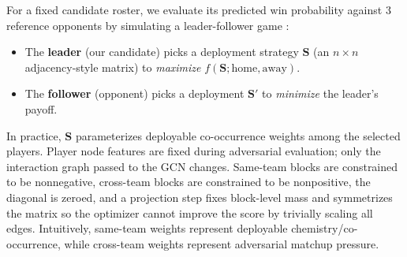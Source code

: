 \documentclass[11pt,letterpaper]{article}
\begin{document}
For a fixed candidate roster, we evaluate its predicted win probability
against $3$ reference opponents by simulating a leader-follower game
\cite{conitzer2006commit}:

\begin{itemize}[leftmargin=*]
  \item The \textbf{leader} (our candidate) picks a deployment strategy
    $\mathbf{S}$ (an $n \times n$ adjacency-style matrix) to
    \emph{maximize} $f(\mathbf{S}; \text{home}, \text{away})$.
  \item The \textbf{follower} (opponent) picks a deployment
    $\mathbf{S}'$ to \emph{minimize} the leader's payoff.
\end{itemize}

In practice, $\mathbf{S}$ parameterizes deployable co-occurrence
weights among the selected players. Player node features are fixed
during adversarial evaluation; only the interaction graph passed to the
GCN changes. Same-team blocks are constrained to be nonnegative,
cross-team blocks are constrained to be nonpositive, the diagonal is
zeroed, and a projection step fixes block-level mass and symmetrizes the
matrix so the optimizer cannot improve the score by trivially scaling
all edges.
Intuitively, same-team weights represent deployable
chemistry/co-occurrence, while cross-team weights represent adversarial
matchup pressure.
\end{document}
